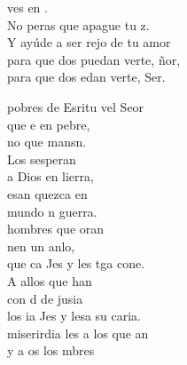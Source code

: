 \documentclass[12pt]{article}
\begin{document}
\begin{multicols*}{2}
\begin{cancion}%
	 ves en . \\
	No peras que apague tu z.\\
	Y ayúde a ser rejo de tu amor\\
	para que dos puedan verte, ñor,\\
	para que dos edan verte, Ser.\\
\end{cancion}%

\end{multicols*}
\newpage
{}
\begin{multicols*}{2}
\begin{cancion}%
	 pobres de Esritu vel Seor \\
	que e en pebre, \\
	no que mansn.  \\
	Los sesperan\\
	a Dios en lierra,\\
	esan quezca en \\
	 mundo n guerra.\\
	 hombres que oran \\
	nen un anlo,\\
	que ca Jes y les tga cone. \\
	A allos que han \\
	con d de jusia\\
	los ia Jes y lesa su caria.\\
	miserirdia les a los que an\\
	y a os los mbres\\

\end{cancion}
\end{multicols*}
\end{document}
